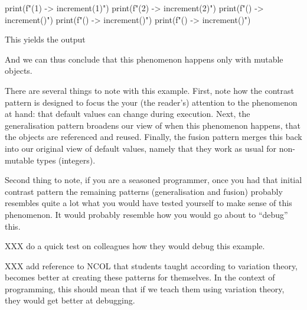 \begin{description}
\begin{pyblock}[default1]
print(f"(1) -> {increment(1)}")
print(f"(2) -> {increment(2)}")
print(f"()  -> {increment()}")
print(f"()  -> {increment()}")
print(f"()  -> {increment()}")
    \end{pyblock}
    \vspace{0.5em}
    This yields the output
    \vspace{0.5em}
    \printpythontex[verbatim][highlightlines={3-5}]

    And we can thus conclude that this phenomenon happens only with mutable 
    objects.
\end{description}

There are several things to note with this example.
First, note how the contrast pattern is designed to focus the your (the 
reader's) attention to the phenomenon at hand: that default values can change 
during execution.
Next, the generalisation pattern broadens our view of when this phenomenon 
happens, that the objects are referenced and reused.
Finally, the fusion pattern merges this back into our original view of default 
values, namely that they work as usual for non-mutable types (\eg integers).

Second thing to note, if you are a seasoned programmer, once you had that 
initial contrast pattern the remaining patterns (generalisation and fusion) 
probably resembles quite a lot what you would have tested yourself to make 
sense of this phenomenon.
It would probably resemble how you would go about to \enquote{debug} this.

XXX do a quick test on colleagues how they would debug this example.

XXX add reference to NCOL that students taught according to variation theory, 
becomes better at creating these patterns for themselves.
In the context of programming, this should mean that if we teach them using 
variation theory, they would get better at debugging.

